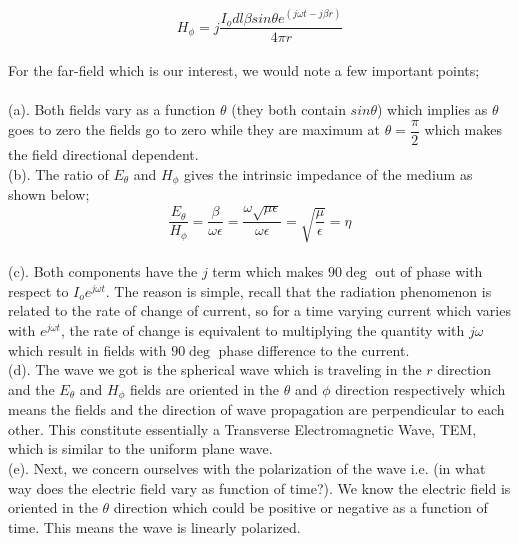 	$$H_\phi = j\dfrac{I_o dl \beta sin\theta   e^{(j\omega t-j\beta r)} }{4\pi r} $$
	\paragraph*{} For the far-field which is our interest, we would note a few important points; \\ \\
	(a). Both fields vary as a function $\theta$ (they both contain $sin\theta$) which implies as $\theta$ goes to zero the fields go to zero while they are maximum at $\theta = \dfrac{\pi}{2}$ which makes the field directional dependent.  \\ 
	(b). The ratio of $E_{\theta}$ and  $H_{\phi}$ gives the intrinsic impedance of the medium as shown below; \\
	$$\dfrac{E_{\theta}}{H_{\phi}} = \dfrac{\beta}{\omega  \epsilon} = \dfrac{\omega \sqrt{\mu \epsilon}}{\omega  \epsilon} = \sqrt{\dfrac{\mu}{\epsilon}} = \eta $$ \\
	(c). Both components have the $j$ term which makes $90\deg$ out of phase with respect to $I_oe^{j\omega t}$. The reason is simple, recall that the radiation phenomenon is related to the rate of change of current, so for a time varying current which varies with $e^{j\omega t}$, the rate of change is equivalent to multiplying the quantity with $j\omega $ which result in fields with $90\deg$ phase difference to the current. \\
	(d). The wave we got is the spherical wave which is traveling in the $r$ direction and the $E_\theta$ and $H_\phi$ fields are oriented in the $\theta$ and $\phi$ direction respectively which means the fields and the direction of wave propagation are perpendicular to each other. This constitute essentially a Transverse Electromagnetic Wave, TEM, which is similar to the uniform plane wave. \\
	(e). Next, we concern ourselves with the polarization of the wave i.e. (in what way does the electric field vary as function of time?). We know the electric field is oriented in the $\theta$ direction which could be positive or negative as a function of time. This means the wave is linearly polarized.
